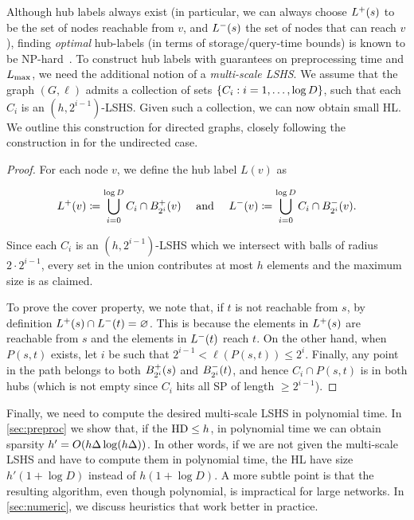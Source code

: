 Although hub labels always exist (in particular, we can always choose $\Lf(s)$ to be the set of nodes reachable from $v$, and $\Lb(s)$ the set of nodes that can reach $v$), finding \emph{optimal} hub-labels (in terms of storage/query-time bounds) is known to be NP-hard~\citep{babenko_hl_complexity}.
To construct hub labels with guarantees on preprocessing time and $\Lm$, we need the additional notion of a \emph{multi-scale LSHS}. 
We assume that the graph $(G,\ell)$ admits a collection of sets $\crl*{C_i: i=1,\ldots,\log D}$, such that each $C_i$ is an $(h,2^{i-1})$-LSHS.
Given such a collection, we can now obtain small HL.
We outline this construction for directed graphs, closely following the construction in \cite[Theorem 5.1]{highway2013} for the undirected case.
\begin{proof}
For each node $v$, we define the hub label $L(v)$ as

\begin{equation*}
\Lf(v)\defeq  \bigcup_{i=0}^{\log D}C_i\cap \Bf_{2^i}(v) \quad\text{ and }\quad
\Lb(v)\defeq \bigcup_{i=0}^{\log D}C_i\cap \Bb_{2^i}(v).
\end{equation*}

Since each $C_i$ is an $(h,2^{i-1})$-LSHS which we intersect with balls of radius $2\cdot 2^{i-1}$, every set in the union contributes at most $h$ elements and the maximum size is as claimed.

To prove the cover property, we note that, if $t$ is not reachable from $s$, by definition $\Lf(s)\cap\Lb(t)=\varnothing$.
This is because the elements in $\Lf(s)$ are reachable from $s$ and the elements in $\Lb(t)$ reach $t$.
On the other hand, when $P(s,t)$ exists, let $i$ be such that $2^{i-1}<\ell(P(s,t))\leq 2^i$.
Finally, any point in the path belongs to both $\Bf_{2^i}(s)$ and $\Bb_{2^i}(t)$, and hence $C_i\cap P(s,t)$ is in both hubs (which is not empty since $C_i$ hits all SP of length $\geq 2^{i-1}$).
\end{proof}


Finally, we need to compute the desired multi-scale LSHS in polynomial time.
In \cref{sec:preproc} we show that, if the $\hd\leq h$, in polynomial time we can obtain sparsity $h'=\Or(h\Delta\log(h\Delta))$.
In other words, if we are not given the multi-scale LSHS and have to compute them in polynomial time, the HL have size $h'(1+\log D)$ instead of $h(1+\log D)$.
A more subtle point is that the resulting algorithm, even though polynomial, is impractical for large networks.
In \cref{sec:numeric}, we discuss heuristics that work better in practice.